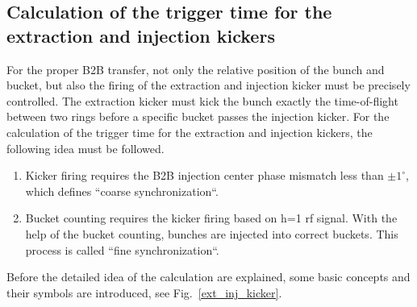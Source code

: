 \subsection{Calculation of the trigger time for the extraction and injection kickers}
\label{sec:compensation}
For the proper B2B transfer, not only the relative position of the bunch and bucket, but also the firing of the extraction and injection kicker must be precisely controlled. The extraction kicker must kick the bunch exactly the time-of-flight between two rings before a specific bucket passes the injection kicker. For the calculation of the trigger time for the extraction and injection kickers, the following idea must be followed. 
\begin{enumerate}
\item Kicker firing requires the B2B injection center phase mismatch less than $\pm 1^\circ$, which defines ``coarse synchronization``.
\item Bucket counting requires the kicker firing based on h=1 rf signal. With the help of the bucket counting, bunches are injected into correct buckets. This process is called ``fine synchronization``.
\end{enumerate}

Before the detailed idea of the calculation are explained, some basic concepts and their symbols are introduced, see Fig.~\ref{ext_inj_kicker}.

